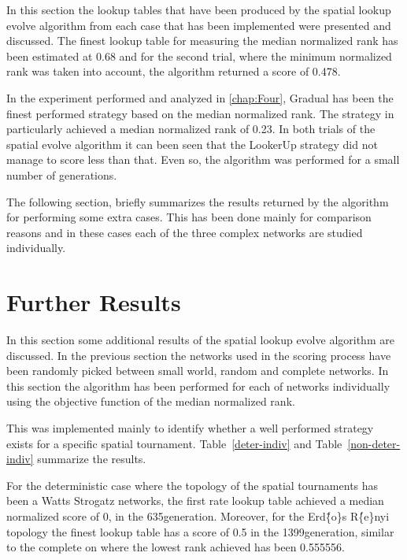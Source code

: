 In this section the lookup tables that have been produced by the spatial lookup
evolve algorithm from each case that has been implemented were presented and discussed.
The finest lookup table for measuring the median normalized rank has been estimated
at 0.68 and for the second trial, where the minimum normalized rank was taken into
account, the algorithm returned a score of 0.478.

In the experiment performed and analyzed in \autoref{chap:Four}, Gradual has been
the finest performed strategy based on the median normalized rank. The strategy in
particularly achieved a median normalized rank of 0.23. In both trials of the
spatial evolve algorithm it can been seen that the LookerUp strategy did not
manage to score less than that. Even so, the algorithm was performed for a small
number of generations.

The following section, briefly summarizes the results returned by the algorithm
for performing some extra cases. This has been done mainly for comparison reasons
and in these cases each of the three complex networks are studied individually.

\section{Further Results}

In this section some additional results of the spatial lookup evolve algorithm
are discussed. In the previous section the networks used in the scoring process
have been randomly picked between small world, random and complete networks.
In this section the algorithm has been performed for each of networks individually
using the objective function of the median normalized rank.

This was implemented mainly to identify whether a well performed strategy
exists for a specific spatial tournament. Table~\ref{deter-indiv} and Table~\ref{non-deter-indiv} summarize the results.

For the deterministic case where the topology of the spatial tournaments has been
a Watts Strogatz networks, the first rate lookup table achieved a median normalized
score of 0, in the 635\nth generation. Moreover, for the Erd\"\{o\}s R\'\{e\}nyi
topology the finest lookup table has a score of 0.5 in the 1399\nth generation, similar
to the complete on where the lowest rank achieved has been 0.555556.

